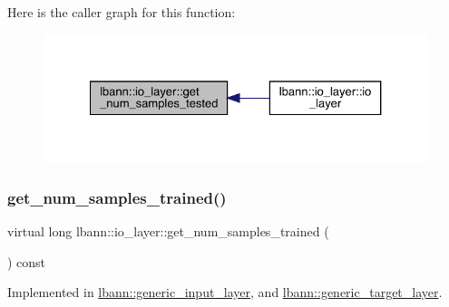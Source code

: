 Here is the caller graph for this function\+:\nopagebreak
\begin{figure}[H]
\begin{center}
\leavevmode
\includegraphics[width=327pt]{classlbann_1_1io__layer_a2b2c9d3c1efce23840ef0c88ec566616_icgraph}
\end{center}
\end{figure}
\mbox{\label{classlbann_1_1io__layer_ad25bf7559a27065c39d0c1d2f849347f}} 
\subsubsection{\texorpdfstring{get\+\_\+num\+\_\+samples\+\_\+trained()}{get\_num\_samples\_trained()}}
{\footnotesize\ttfamily virtual long lbann\+::io\+\_\+layer\+::get\+\_\+num\+\_\+samples\+\_\+trained (\begin{DoxyParamCaption}{ }\end{DoxyParamCaption}) const\hspace{0.3cm}{\ttfamily [pure virtual]}}



Implemented in \hyperlink{classlbann_1_1generic__input__layer_a95a7a5ad2a6089ffb9197632015e6062}{lbann\+::generic\+\_\+input\+\_\+layer}, and \hyperlink{classlbann_1_1generic__target__layer_abff09be96adbd480f35fcfba3c6cfc5a}{lbann\+::generic\+\_\+target\+\_\+layer}.

